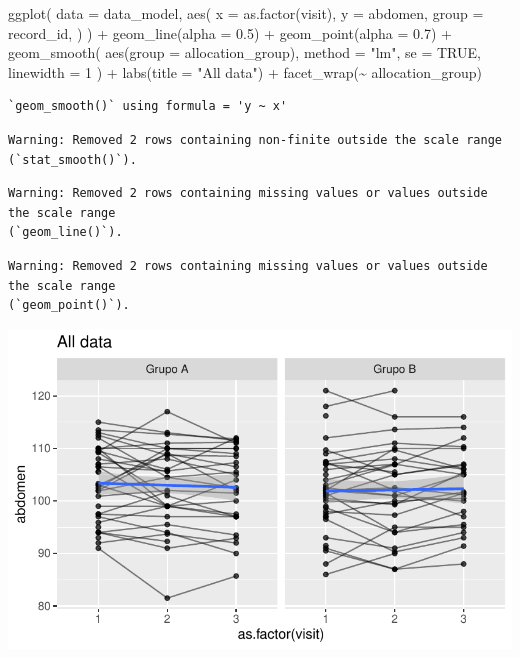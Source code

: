 \documentclass[
  letterpaper,
  DIV=11,
  numbers=noendperiod]{scrartcl}
\newenvironment{Shaded}{\begin{snugshade}}{\end{snugshade}}
\newcommand{\AttributeTok}[1]{\textcolor[rgb]{0.40,0.45,0.13}{#1}}
\newcommand{\ConstantTok}[1]{\textcolor[rgb]{0.56,0.35,0.01}{#1}}
\newcommand{\DecValTok}[1]{\textcolor[rgb]{0.68,0.00,0.00}{#1}}
\newcommand{\FloatTok}[1]{\textcolor[rgb]{0.68,0.00,0.00}{#1}}
\newcommand{\FunctionTok}[1]{\textcolor[rgb]{0.28,0.35,0.67}{#1}}
\newcommand{\NormalTok}[1]{\textcolor[rgb]{0.00,0.23,0.31}{#1}}
\newcommand{\SpecialCharTok}[1]{\textcolor[rgb]{0.37,0.37,0.37}{#1}}
\newcommand{\StringTok}[1]{\textcolor[rgb]{0.13,0.47,0.30}{#1}}
\begin{document}
\begin{Shaded}
\begin{Highlighting}[]
\FunctionTok{ggplot}\NormalTok{(}
    \AttributeTok{data =}\NormalTok{ data\_model, }
    \FunctionTok{aes}\NormalTok{(}
        \AttributeTok{x =} \FunctionTok{as.factor}\NormalTok{(visit),}
        \AttributeTok{y =}\NormalTok{ abdomen,}
        \AttributeTok{group =}\NormalTok{ record\_id,}
\NormalTok{    )}
\NormalTok{) }\SpecialCharTok{+}
    \FunctionTok{geom\_line}\NormalTok{(}\AttributeTok{alpha =} \FloatTok{0.5}\NormalTok{) }\SpecialCharTok{+}
    \FunctionTok{geom\_point}\NormalTok{(}\AttributeTok{alpha =} \FloatTok{0.7}\NormalTok{) }\SpecialCharTok{+}
    \FunctionTok{geom\_smooth}\NormalTok{(}
        \FunctionTok{aes}\NormalTok{(}\AttributeTok{group =}\NormalTok{ allocation\_group),}
        \AttributeTok{method =} \StringTok{"lm"}\NormalTok{,}
        \AttributeTok{se =} \ConstantTok{TRUE}\NormalTok{,}
        \AttributeTok{linewidth =} \DecValTok{1}
\NormalTok{    ) }\SpecialCharTok{+}
    \FunctionTok{labs}\NormalTok{(}\AttributeTok{title =} \StringTok{"All data"}\NormalTok{) }\SpecialCharTok{+}
    \FunctionTok{facet\_wrap}\NormalTok{(}\SpecialCharTok{\textasciitilde{}}\NormalTok{ allocation\_group) }
\end{Highlighting}
\end{Shaded}

\begin{verbatim}
`geom_smooth()` using formula = 'y ~ x'
\end{verbatim}

\begin{verbatim}
Warning: Removed 2 rows containing non-finite outside the scale range
(`stat_smooth()`).
\end{verbatim}

\begin{verbatim}
Warning: Removed 2 rows containing missing values or values outside the scale range
(`geom_line()`).
\end{verbatim}

\begin{verbatim}
Warning: Removed 2 rows containing missing values or values outside the scale range
(`geom_point()`).
\end{verbatim}

\includegraphics{Outcomes_V1V2V3_files/figure-pdf/abdomen_6-1.pdf}
\end{document}
